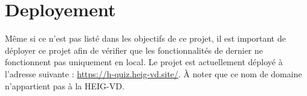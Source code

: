 \section{Deployement}
Même si ce n'est pas listé dans les objectifs de ce projet, il est important de déployer ce projet afin de vérifier que les fonctionnalités de dernier ne fonctionnent pas uniquement en local. Le projet est actuellement déployé à l'adresse suivante : \url{https://h-quiz.heig-vd.site/}. À noter que ce nom de domaine n'appartient pas à la HEIG-VD.